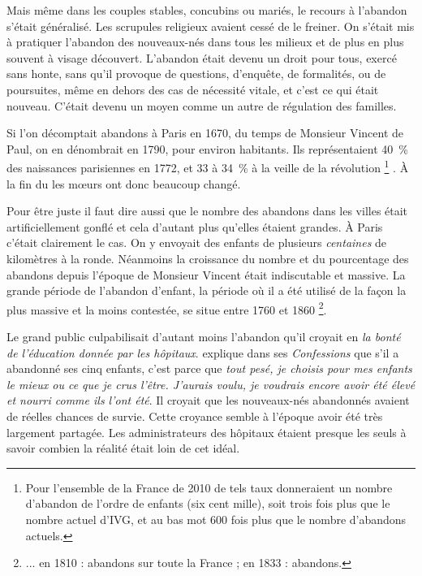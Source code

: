  Mais même dans les couples stables, concubins ou mariés, le recours à l'abandon s'était généralisé. Les scrupules religieux avaient cessé de le freiner. On s'était mis à pratiquer l'abandon des nouveaux-nés dans tous les milieux et de plus en plus souvent à visage découvert. L'abandon était devenu un droit pour tous, exercé sans honte, sans qu'il provoque de questions, d'enquête, de formalités, ou de poursuites, même en dehors des cas de nécessité vitale, et c'est ce qui était nouveau. C'était devenu un moyen comme un autre de régulation des familles. 
 
  Si l'on décomptait  abandons à Paris en 1670, du temps de Monsieur Vincent de Paul, on en dénombrait  en 1790, pour environ  habitants. Ils représentaient 40~\% des naissances parisiennes en 1772, et 33 à 34~\% à la veille de la révolution%
\footnote{Pour l'ensemble de la France de 2010 de tels taux donneraient un nombre d'abandon de l'ordre de  enfants (six cent mille), soit trois fois plus que le nombre actuel d'IVG, et au bas mot 600 fois plus que le nombre d'abandons actuels.}%
. À la fin du  les mœurs ont donc beaucoup changé.

 Pour être juste il faut dire aussi que le nombre des abandons dans les villes était artificiellement gonflé et cela d'autant plus qu'elles étaient grandes. À Paris c'était clairement le cas. On y envoyait des enfants de plusieurs \emph{centaines} de kilomètres à la ronde. Néanmoins la croissance du nombre et du pourcentage des abandons depuis l'époque de Monsieur Vincent était indiscutable et massive. La grande période de l'abandon d'enfant, la période où il a été utilisé de la façon la plus massive et la moins contestée, se situe entre 1760 et 1860%
\footnote{... en 1810 :  abandons sur toute la France ; en 1833 :  abandons.}.

 Le grand public culpabilisait d'autant moins l'abandon qu'il croyait en \emph{la bonté de l'éducation donnée par les hôpitaux}.  explique dans ses \emph{Confessions} que s'il a abandonné ses cinq enfants, c'est parce que \emph{tout pesé, je choisis pour mes enfants le mieux ou ce que je crus l'être. J'aurais voulu, je voudrais encore avoir été élevé et nourri comme ils l'ont été}. Il croyait que les nouveaux-nés abandonnés avaient de réelles chances de survie. Cette croyance semble à l'époque avoir été très largement partagée. Les administrateurs des hôpitaux étaient presque les seuls à savoir combien la réalité était loin de cet idéal. 

